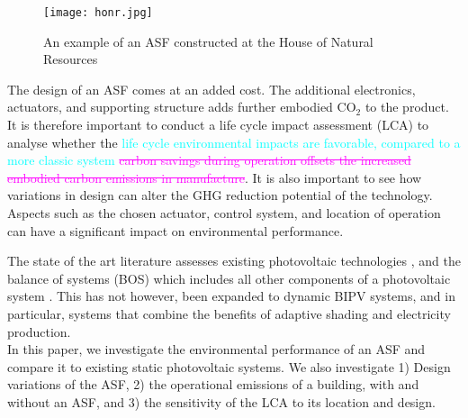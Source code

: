\begin{figure}
\begin{center}
\texttt{[image: honr.jpg]}
\caption{An example of an ASF constructed at the House of Natural Resources \cite{nagy2015frontiers}}
\label{fig:HoNR}
\end{center}
\end{figure}

The design of an ASF comes at an added cost. The additional electronics, actuators, and supporting structure adds further embodied CO$_2$ to the product. It is therefore important to conduct a life cycle impact assessment (LCA) to analyse whether the \textcolor{cyan}{life cycle environmental impacts are favorable, compared to a more classic system} \textcolor{magenta}{\sout{carbon savings during operation offsets the increased embodied carbon emissions in manufacture}}. It is also important to see how variations in design can alter the GHG reduction potential of the technology. Aspects such as the chosen actuator, control system, and location of operation can have a significant impact on environmental performance. 

The state of the art literature assesses existing photovoltaic technologies \cite{raugei2007life} \cite{de2013energy} \cite{fthenakis2011photovoltaics}, and the balance of systems (BOS) which includes all other components of a photovoltaic system \cite{mason2006energy}. This has not however, been expanded to dynamic BIPV systems, and in particular, systems that combine the benefits of adaptive shading and electricity production.\\



In this paper, we investigate the environmental performance of an ASF and compare it to existing static photovoltaic systems. We also investigate 1) Design variations of the ASF, 2) the operational emissions of a building, with and without an ASF, and 3) the sensitivity of the LCA to its location and design.



